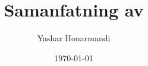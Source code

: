 \documentclass[a4paper, 11pt]{article}
\title{Samanfatning av}
\author{Yashar Honarmandi}
\date{\today}
\begin{document}
\sloppy

\maketitle

\begin{abstract}
	
\end{abstract}

\thispagestyle{empty}

\newpage

\tableofcontents

\newpage

\end{document}
